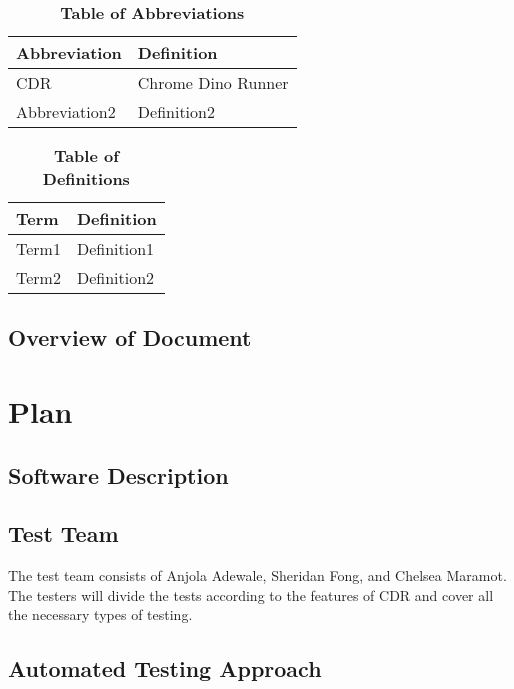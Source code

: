 \documentclass[12pt, titlepage]{article}
\begin{document}
\begin{table}[hbp]
    \caption{\textbf{Table of Abbreviations}} \label{Table}
    
    \begin{tabularx}{\textwidth}{p{3cm}X}
    \toprule
    \textbf{Abbreviation} & \textbf{Definition} \\
    \midrule
    CDR & Chrome Dino Runner\\
    Abbreviation2 & Definition2\\
    \bottomrule
    \end{tabularx}
    
    \end{table}
    

\begin{table}[!htbp]
\caption{\textbf{Table of Definitions}} \label{Table}

\begin{tabularx}{\textwidth}{p{3cm}X}
\toprule
\textbf{Term} & \textbf{Definition}\\
\midrule
Term1 & Definition1\\
Term2 & Definition2\\
\bottomrule
\end{tabularx}

\end{table}	

\subsection{Overview of Document}

\section{Plan}
	
\subsection{Software Description}

\subsection{Test Team}

The test team consists of Anjola Adewale, Sheridan Fong, and Chelsea Maramot. The testers will divide the tests according to the features of CDR and cover all the necessary types of testing.

\subsection{Automated Testing Approach}
\end{document}
